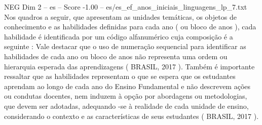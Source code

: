\begin{textsample}{NEG Dim 2 – es – Score -1.00 – es/es\_ef\_anos\_iniciais\_linguagens\_lp\_7.txt}
Nos quadros a seguir, que apresentam as unidades temáticas, os objetos de conhecimento e as habilidades definidas para cada ano ( ou bloco de anos ), cada habilidade é identificada por um código alfanumérico cuja composição é a seguinte : Vale destacar que o uso de numeração sequencial para identificar as habilidades de cada ano ou bloco de anos não representa uma ordem ou hierarquia esperada das aprendizagens ( BRASIL, 2017 ).
Também é importante ressaltar que as habilidades representam o que se espera que os estudantes aprendam ao longo de cada ano do Ensino Fundamental e não descrevem ações ou condutas docentes, nem induzem à opção por abordagens ou metodologias, que devem ser adotadas, adequando -se à realidade de cada unidade de ensino, considerando o contexto e as características de seus estudantes ( BRASIL, 2017 ).

\end{textsample}
